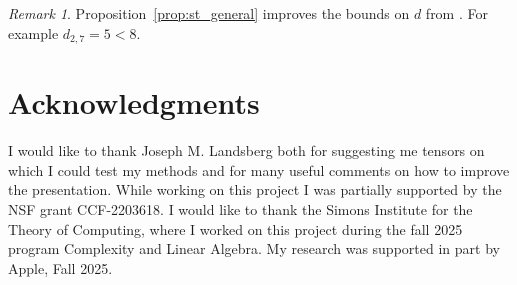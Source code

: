 \documentclass[12pt]{amsart}
\theoremstyle{definition}
\theoremstyle{remark}
\newtheorem{remark}[theorem]{Remark}
\theoremstyle{definition}
\begin{document}
\begin{remark}
Proposition~\ref{prop:st_general} improves the bounds on $d$ from \cite[Theorem~1.1]{Man22}. For example $d_{2,7} = 5 < 8$.
    \end{remark}


\section*{Acknowledgments}
I would like to thank Joseph M. Landsberg both for suggesting me tensors on which I could test my methods and for many useful comments on how to improve the presentation.
While working on this project I was partially supported by the NSF grant CCF-2203618. I would like to thank the Simons Institute for the Theory of Computing, where I worked on this project
during the fall 2025 program Complexity and Linear Algebra. My research was supported in part by Apple, Fall 2025.
\end{document}
